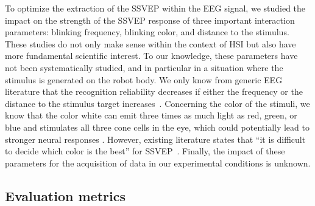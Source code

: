 \documentclass[smallextended]{svjour3}
\begin{document}
To optimize the extraction of the SSVEP within the EEG signal, we studied the impact on the strength of the SSVEP response of three important interaction parameters: blinking frequency, blinking color, and distance to the stimulus. 
These studies do not only make sense within the context of HSI but also have more fundamental scientific interest. 
To our knowledge, these parameters have not been systematically studied, and in particular in a situation where the stimulus is generated on the robot body. We only know from generic EEG literature that the recognition reliability decreases if either the frequency or the distance to the stimulus target increases~\cite{herrmann2001,wu2013effect}. 
Concerning the color of the stimuli, we know that the color white can emit three times as much light as red, green, or blue and stimulates all three cone cells in the eye, which could potentially lead to stronger neural responses \cite{aljshamee2016discriminate,cao2012flashing}. 
However, existing literature states that ``it is difficult to decide which color is the best'' for SSVEP~\cite{Zhu2010}.
Finally, the impact of these parameters for the acquisition of data in our experimental conditions is unknown. 
\\
\subsection{Evaluation metrics}
\end{document}
